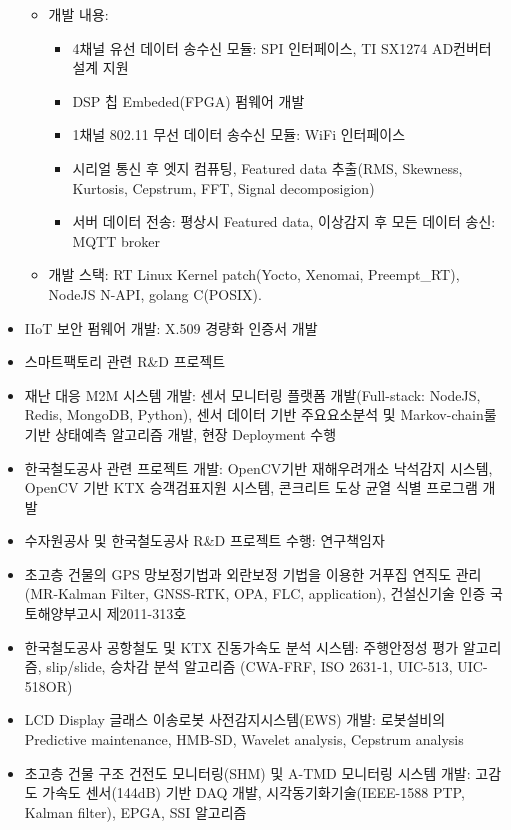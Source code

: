 \begin{itemize}
\begin{itemize}
    \item 개발 내용:
    \begin{itemize}
      \item 4채널 유선 데이터 송수신 모듈: SPI 인터페이스, TI SX1274 AD컨버터 설계 지원
      \item DSP 칩 Embeded(FPGA) 펌웨어 개발
      \item 1채널 802.11 무선 데이터 송수신 모듈: WiFi 인터페이스
      \item 시리얼 통신 후 엣지 컴퓨팅, Featured data 추출(RMS, Skewness, Kurtosis, Cepstrum, FFT, Signal decomposigion)
      \item 서버 데이터 전송: 평상시 Featured data, 이상감지 후 모든 데이터 송신: MQTT broker
    \end{itemize}
    \item 개발 스택: RT Linux Kernel patch(Yocto, Xenomai, Preempt\_RT), NodeJS N-API, golang C(POSIX).
  \end{itemize}
	\item IIoT 보안 펌웨어 개발: X.509 경량화 인증서 개발
	\item 스마트팩토리 관련 R\&D 프로젝트
\end{itemize}

\divider

\begin{itemize}
	\item 재난 대응 M2M 시스템 개발: 센서 모니터링 플랫폼 개발(Full-stack: NodeJS, Redis, MongoDB, Python), 센서 데이터 기반 주요요소분석 및 Markov-chain룰 기반 상태예측 알고리즘 개발, 현장 Deployment 수행
	\item 한국철도공사 관련 프로젝트 개발: OpenCV기반 재해우려개소 낙석감지 시스템, OpenCV 기반 KTX 승객검표지원 시스템, 콘크리트 도상 균열 식별 프로그램 개발
	\item 수자원공사 및 한국철도공사 R\&D 프로젝트 수행: 연구책임자
\end{itemize}

\divider

\begin{itemize}
	\item 초고층 건물의 GPS 망보정기법과 외란보정 기법을 이용한 거푸집 연직도 관리 (MR-Kalman Filter, GNSS-RTK, OPA, FLC, application), 건설신기술 인증 국토해양부고시 제2011-313호
	\item 한국철도공사 공항철도 및 KTX 진동가속도 분석 시스템: 주행안정성 평가 알고리즘, slip/slide, 승차감 분석 알고리즘 (CWA-FRF, ISO 2631-1, UIC-513, UIC-518OR)
	\item LCD Display 글래스 이송로봇 사전감지시스템(EWS) 개발: 로봇설비의 Predictive maintenance, HMB-SD, Wavelet analysis, Cepstrum analysis
	\item 초고층 건물 구조 건전도 모니터링(SHM) 및 A-TMD 모니터링 시스템 개발: 고감도 가속도 센서(144dB) 기반 DAQ 개발, 시각동기화기술(IEEE-1588 PTP, Kalman filter), EPGA, SSI 알고리즘
\end{itemize}